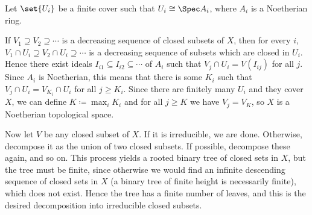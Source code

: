 Let $\set{U_i}$ be a finite cover such that $U_i\cong \Spec A_i$, where $A_i$
is a Noetherian ring.

If $V_1 \supseteq V_2\supseteq \cdots$ is a decreasing sequence of closed
subsets of $X$, then for every $i$,
$V_1 \cap U_i\supseteq V_2\cap U_i \supseteq \cdots$ is a decreasing sequence
of subsets which are closed in $U_i$. Hence there exist ideals
$I_{i1} \subseteq I_{i2} \subseteq\cdots$ of $A_i$ such that $V_j\cap U_i = V(I_{ij})$
for all $j$. Since $A_i$ is Noetherian, this means that there is some $K_i$ such
that $V_j\cap U_i = V_{K_i} \cap U_i$ for all $j \geq K_i$. Since there are finitely
many $U_i$ and they cover $X$, we can define $K\coloneqq \max_i K_i$ and
for all $j \geq K$ we have $V_j = V_K$, so $X$ is a Noetherian topological space.

Now let $V$ be any closed subset of $X$. If it is irreducible, we are done.
Otherwise, decompose it as the union of two closed subsets. If possible, decompose
these again, and so on. This process yields a rooted binary tree of closed
sets in $X$, but the tree must be finite, since otherwise we would find an infinite
descending sequence of closed sets in $X$ (a binary tree of finite height is necessarily
finite), which does not exist. Hence the tree has
a finite number of leaves, and this is the desired decomposition into irreducible
closed subsets.
